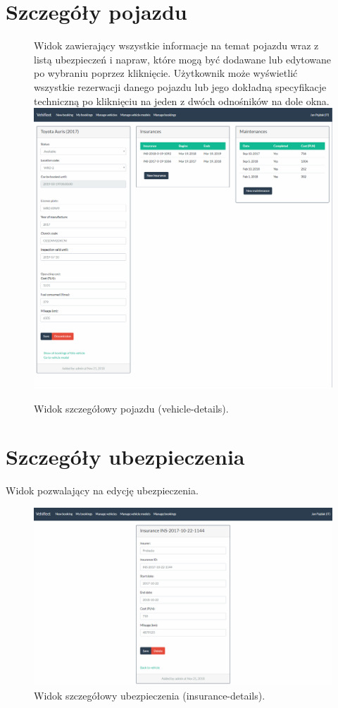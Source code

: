 \documentclass[eng,printmode,openany]{mgr}
\begin{document}
	\section{Szczegóły pojazdu}	
	\begin{figure}[H]
		Widok zawierający wszystkie informacje na temat pojazdu wraz z listą ubezpieczeń i napraw, które mogą być dodawane lub edytowane po wybraniu poprzez kliknięcie. Użytkownik może wyświetlić wszystkie rezerwacji danego pojazdu lub jego dokładną specyfikacje techniczną po kliknięciu na jeden z dwóch odnośników na dole okna.
		\centering
		\includegraphics[width=\textwidth]{images/views/vehicle-detail.png}
		\caption{Widok szczegółowy pojazdu (vehicle-details).}		
	\end{figure}
	
	\newpage
	\section{Szczegóły ubezpieczenia}
	Widok pozwalający na edycję ubezpieczenia.
	\begin{figure}[H]
		\centering
		\includegraphics[scale=0.32]{images/views/insurance-detail.png}
		\caption{Widok szczegółowy ubezpieczenia (insurance-details).}		
	\end{figure}
	
\end{document}
